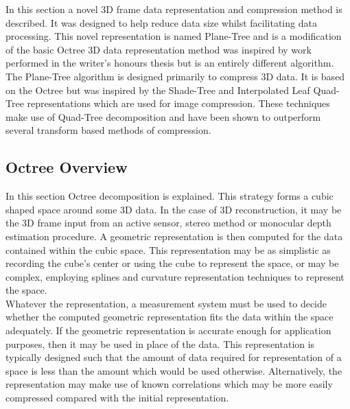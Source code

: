 In this section a novel 3D frame data representation and compression method is described. It was designed to help reduce data size whilst facilitating data processing. This novel representation is named Plane-Tree and is a modification of the basic Octree 3D data representation method was inspired by work performed in the writer's honours thesis \cite{Lincoln13Hons} but is an entirely different algorithm. \\

The Plane-Tree algorithm is designed primarily to compress 3D data. It is based on the Octree but was inspired by the Shade-Tree and Interpolated Leaf Quad-Tree representations \cite{Gonzalez07ShadeTree, Lincoln13Interpolating} which are used for image compression. These techniques make use of Quad-Tree decomposition and have been shown to outperform several transform based methods of compression. 

\subsection{Octree Overview}

In this section Octree decomposition is explained. This strategy forms a cubic shaped space around some 3D data. In the case of 3D reconstruction, it may be the 3D frame input from an active sensor, stereo method or monocular depth estimation procedure. A geometric representation is then computed for the data contained within the cubic space. This representation may be as simplistic as recording the cube's center or using the cube to represent the space, or may be complex, employing splines and curvature representation techniques to represent the space. \\

Whatever the representation, a measurement system must be used to decide whether the computed geometric representation fits the data within the space adequately. If the geometric representation is accurate enough for application purposes, then it may be used in place of the data. This representation is typically designed such that the amount of data required for representation of a space is less than the amount which would be used otherwise. Alternatively, the representation may make use of known correlations which may be more easily compressed compared with the initial representation. \\


